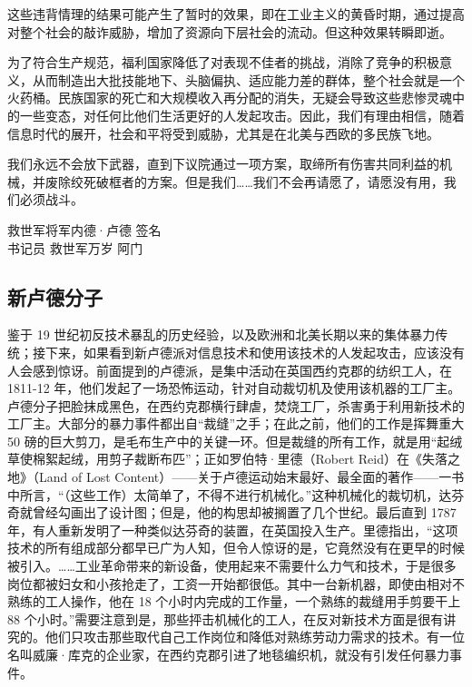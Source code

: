 这些违背情理的结果可能产生了暂时的效果，即在工业主义的黄昏时期，通过提高对整个社会的敲诈威胁，增加了资源向下层社会的流动。但这种效果转瞬即逝。

为了符合生产规范，福利国家降低了对表现不佳者的挑战，消除了竞争的积极意义，从而制造出大批技能地下、头脑偏执、适应能力差的群体，整个社会就是一个火药桶。民族国家的死亡和大规模收入再分配的消失，无疑会导致这些悲惨灵魂中的一些变态，对任何比他们生活更好的人发起攻击。因此，我们有理由相信，随着信息时代的展开，社会和平将受到威胁，尤其是在北美与西欧的多民族飞地。

\begin{tcolorbox}
我们永远不会放下武器，直到下议院通过一项方案，取缔所有伤害共同利益的机械，并废除绞死破框者的方案。但是我们……我们不会再请愿了，请愿没有用，我们必须战斗。  
\begin{center}
救世军将军内德·卢德 签名 \\
书记员 救世军万岁 阿门
\end{center}
\end{tcolorbox}


\subsection{新卢德分子}
鉴于 19 世纪初反技术暴乱的历史经验，以及欧洲和北美长期以来的集体暴力传统；接下来，如果看到新卢德派对信息技术和使用该技术的人发起攻击，应该没有人会感到惊讶。前面提到的卢德派，是集中活动在英国西约克郡的纺织工人，在 1811-12 年，他们发起了一场恐怖运动，针对自动裁切机及使用该机器的工厂主。卢德分子把脸抹成黑色，在西约克郡横行肆虐，焚烧工厂，杀害勇于利用新技术的工厂主。大部分的暴力事件都出自“裁缝”之手；在此之前，他们的工作是挥舞重大 50 磅的巨大剪刀，是毛布生产中的关键一环。但是裁缝的所有工作，就是用“起绒草使棉絮起绒，用剪子裁断布匹”；正如罗伯特·里德（Robert Reid）在《失落之地》（Land of Lost Content）——关于卢德运动始末最好、最全面的著作——一书中所言，“（这些工作）太简单了，不得不进行机械化。”这种机械化的裁切机，达芬奇就曾经勾画出了设计图；但是，他的构思却被搁置了几个世纪。最后直到 1787 年，有人重新发明了一种类似达芬奇的装置，在英国投入生产。里德指出，“这项技术的所有组成部分都早已广为人知，但令人惊讶的是，它竟然没有在更早的时候被引入。……工业革命带来的新设备，使用起来不需要什么力气和技术，于是很多岗位都被妇女和小孩抢走了，工资一开始都很低。其中一台新机器，即使由相对不熟练的工人操作，他在 18 个小时内完成的工作量，一个熟练的裁缝用手剪要干上 88 个小时。”需要注意到是，那些抨击机械化的工人，在反对新技术方面是很有讲究的。他们只攻击那些取代自己工作岗位和降低对熟练劳动力需求的技术。有一位名叫威廉·库克的企业家，在西约克郡引进了地毯编织机，就没有引发任何暴力事件。

